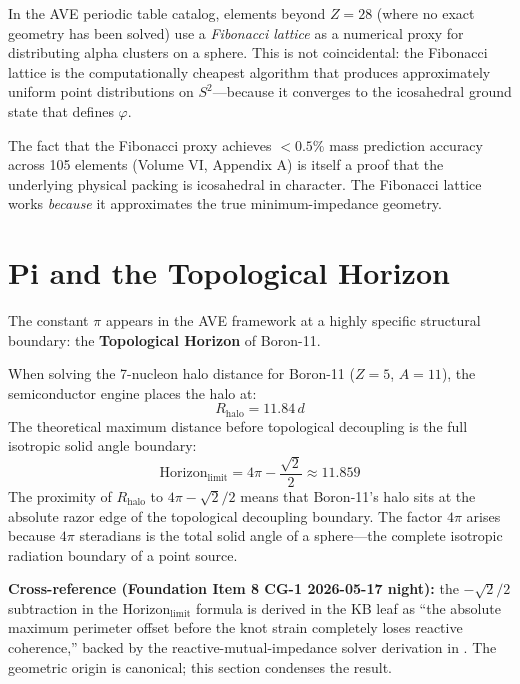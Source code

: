 In the AVE periodic table catalog, elements beyond $Z=28$ (where no exact geometry has been solved) use a \textit{Fibonacci lattice} as a numerical proxy for distributing alpha clusters on a sphere. This is not coincidental: the Fibonacci lattice is the computationally cheapest algorithm that produces approximately uniform point distributions on $S^2$---because it converges to the icosahedral ground state that defines $\varphi$.

The fact that the Fibonacci proxy achieves $<0.5\%$ mass prediction accuracy across 105 elements (Volume VI, Appendix A) is itself a proof that the underlying physical packing is icosahedral in character. The Fibonacci lattice works \textit{because} it approximates the true minimum-impedance geometry.

\section{Pi and the Topological Horizon}
\label{sec:pi_horizon}

The constant $\pi$ appears in the AVE framework at a highly specific structural boundary: the \textbf{Topological Horizon} of Boron-11.

When solving the 7-nucleon halo distance for Boron-11 ($Z=5$, $A=11$), the semiconductor engine places the halo at:
\begin{equation}
    R_{\text{halo}} = 11.84\,d
\end{equation}
The theoretical maximum distance before topological decoupling is the full isotropic solid angle boundary:
\begin{equation}
    \text{Horizon}_{\text{limit}} = 4\pi - \frac{\sqrt{2}}{2} \approx 11.859
\end{equation}
The proximity of $R_{\text{halo}}$ to $4\pi - \sqrt{2}/2$ means that Boron-11's halo sits at the absolute razor edge of the topological decoupling boundary. The factor $4\pi$ arises because $4\pi$ steradians is the total solid angle of a sphere---the complete isotropic radiation boundary of a point source.

\textbf{Cross-reference (Foundation Item 8 CG-1 2026-05-17 night):} the $-\sqrt{2}/2$ subtraction in the Horizon$_{\text{limit}}$ formula is derived in the KB leaf  as ``the absolute maximum perimeter offset before the knot strain completely loses reactive coherence,'' backed by the reactive-mutual-impedance solver derivation in . The geometric origin is canonical; this section condenses the result.


